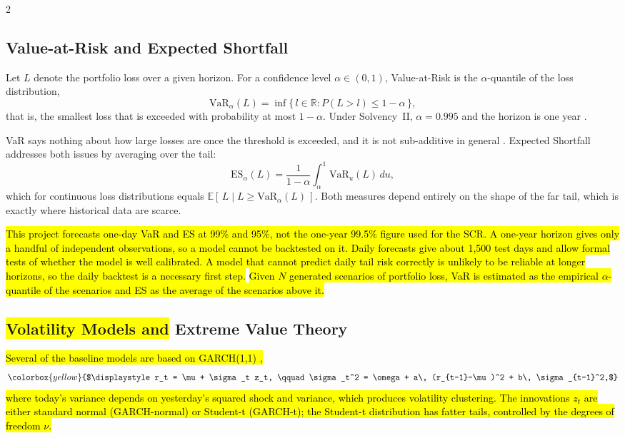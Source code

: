 \documentclass[12pt]{spieman}  %
\newcommand{\new}[1]{\hl{#1}}
\newcommand{\neweq}[1]{\colorbox{yellow}{$\displaystyle #1$}}
\begin{document}
\begin{spacing}{2}
\subsection{Value-at-Risk and Expected Shortfall}

Let $L$ denote the portfolio loss over a given horizon. For a confidence level $\alpha \in (0,1)$, Value-at-Risk is the $\alpha$-quantile of the loss distribution,
\begin{equation}
\mathrm{VaR}_\alpha(L) = \inf\{\, l \in \mathbb{R} : P(L > l) \le 1-\alpha \,\},
\end{equation}
that is, the smallest loss that is exceeded with probability at most $1-\alpha$. Under Solvency~II, $\alpha = 0.995$ and the horizon is one year \cite{SolvencyII}.

VaR says nothing about how large losses are once the threshold is exceeded, and it is not sub-additive in general \cite{Artzner99}. Expected Shortfall addresses both issues by averaging over the tail:
\begin{equation}
\mathrm{ES}_\alpha(L) = \frac{1}{1-\alpha}\int_\alpha^1 \mathrm{VaR}_u(L)\,du,
\end{equation}
which for continuous loss distributions equals $\mathbb{E}[\,L \mid L \ge \mathrm{VaR}_\alpha(L)\,]$. Both measures depend entirely on the shape of the far tail, which is exactly where historical data are scarce.

\new{This project forecasts one-day VaR and ES at 99\% and 95\%, not the one-year 99.5\% figure used for the SCR. A one-year horizon gives only a handful of independent observations, so a model cannot be backtested on it. Daily forecasts give about 1,500 test days and allow formal tests of whether the model is well calibrated. A model that cannot predict daily tail risk correctly is unlikely to be reliable at longer horizons, so the daily backtest is a necessary first step.} \new{Given $N$ generated scenarios of portfolio loss, VaR is estimated as the empirical $\alpha$-quantile of the scenarios and ES as the average of the scenarios above it.}

\subsection{\protect\colorbox{yellow}{Volatility Models and} Extreme Value Theory}

\new{Several of the baseline models are based on GARCH(1,1) \cite{Bollerslev86},}
\begin{equation}
\neweq{r_t = \mu + \sigma_t z_t, \qquad \sigma_t^2 = \omega + a\, (r_{t-1}-\mu)^2 + b\, \sigma_{t-1}^2,}
\end{equation}
\new{where today's variance depends on yesterday's squared shock and variance, which produces volatility clustering. The innovations $z_t$ are either standard normal (GARCH-normal) or Student-t (GARCH-t); the Student-t distribution has fatter tails, controlled by the degrees of freedom $\nu$.}


\end{spacing}
\end{document}
